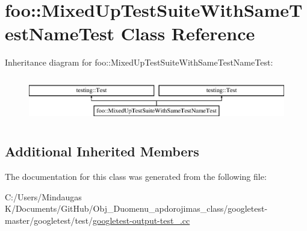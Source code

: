 \hypertarget{classfoo_1_1_mixed_up_test_suite_with_same_test_name_test}{}\section{foo\+::Mixed\+Up\+Test\+Suite\+With\+Same\+Test\+Name\+Test Class Reference}
\label{classfoo_1_1_mixed_up_test_suite_with_same_test_name_test}
Inheritance diagram for foo\+::Mixed\+Up\+Test\+Suite\+With\+Same\+Test\+Name\+Test\+:\begin{figure}[H]
\begin{center}
\leavevmode
\includegraphics[height=2.000000cm]{dd/d4e/classfoo_1_1_mixed_up_test_suite_with_same_test_name_test}
\end{center}
\end{figure}
\subsection*{Additional Inherited Members}


The documentation for this class was generated from the following file\+:\begin{DoxyCompactItemize}
\item 
C\+:/\+Users/\+Mindaugas K/\+Documents/\+Git\+Hub/\+Obj\+\_\+\+Duomenu\+\_\+apdorojimas\+\_\+class/googletest-\/master/googletest/test/\mbox{\hyperlink{googletest-master_2googletest_2test_2googletest-output-test___8cc}{googletest-\/output-\/test\+\_\+.\+cc}}\end{DoxyCompactItemize}
